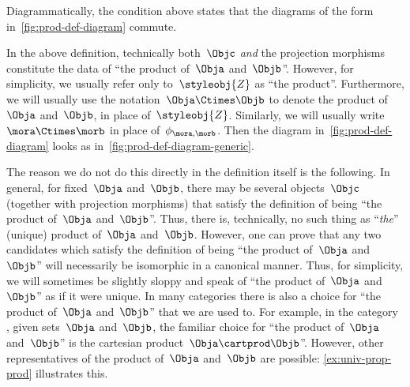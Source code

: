 \begin{marginfigure}
    \centering
    \caption{}
    \label{fig:prod-def-diagram}
\end{marginfigure}

\begin{remark}
    \label{re:prod-comm-diag}
    Diagrammatically, the condition above states that the diagrams of the form in~\cref{fig:prod-def-diagram} commute.
\end{remark}

\begin{marginfigure}
    \centering
    \caption{}
    \label{fig:prod-def-diagram-generic}
\end{marginfigure}

\begin{remark}
    \label{prod unique up to iso}
    In the above definition, technically both~$\Objc$ \emph{and} the projection morphisms constitute the data of ``the product of~$\Obja$ and~$\Objb$''.
    However, for simplicity, we usually refer only to~$\styleobj{Z}$ as ``the product''.
    Furthermore, we will usually use the notation~$\Obja \Ctimes \Objb$ to denote the product of~$\Obja$ and~$\Objb$, in place of~$\styleobj{Z}$.
    Similarly, we will usually write~$\mora \Ctimes \morb$ in place of~$\phi_{\mora, \morb}$.
    Then the diagram in~\cref{fig:prod-def-diagram} looks as in~\cref{fig:prod-def-diagram-generic}.

    The reason we do not do this directly in the definition itself is the following.
    In general, for fixed~$\Obja$ and~$\Objb$, there may be several objects~$\Objc$ (together with projection morphisms) that satisfy the definition of being ``the product of~$\Obja$ and~$\Objb$''.
    Thus, there is, technically, no such thing as ``\emph{the}'' (unique) product of~$\Obja$ and~$\Objb$.
    However, one can prove that any two candidates which satisfy the definition of being ``the product of~$\Obja$ and~$\Objb$'' will necessarily be isomorphic in a canonical manner.
    Thus, for simplicity, we will sometimes be slightly sloppy and speak of ``the product of~$\Obja$ and~$\Objb$'' as if it were unique.
    In many categories there is also a choice for ``the product of~$\Obja$ and~$\Objb$'' that we are used to.
    For example, in the category \Set, given sets~$\Obja$ and~$\Objb$, the familiar choice for ``the product of~$\Obja$ and~$\Objb$'' is the cartesian product~$\Obja \cartprod \Objb$''.
    However, other representatives of the product of~$\Obja$ and~$\Objb$ are possible: \cref{ex:univ-prop-prod} illustrates this.
\end{remark}

